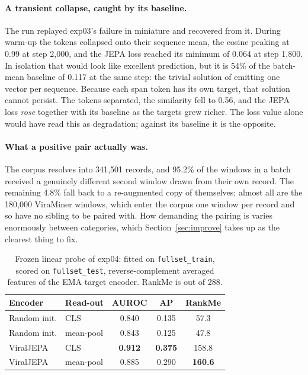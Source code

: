 \documentclass[10pt,twocolumn,a4paper]{article}
\begin{document}
\paragraph{A transient collapse, caught by its baseline.}
The run replayed exp03's failure in miniature and recovered from it. During
warm-up the tokens collapsed onto their sequence mean, the cosine peaking at 0.99
at step 2{,}000, and the JEPA loss reached its minimum of 0.064 at step 1{,}800.
In isolation that would look like excellent prediction, but it is 54\% of the
batch-mean baseline of 0.117 at the same step: the trivial solution of emitting
one vector per sequence. Because each span token has
its own target, that solution cannot persist. The tokens separated, the
similarity fell to 0.56, and the JEPA loss \emph{rose} together with its baseline
as the targets grew richer. The loss value alone would have read this as
degradation; against its baseline it is the opposite.

\paragraph{What a positive pair actually was.}
The corpus resolves into 341{,}501 records, and 95.2\% of the windows in a batch
received a genuinely different second window drawn from their own record. The
remaining 4.8\% fall back to a re-augmented copy of themselves; almost all are
the 180{,}000 ViraMiner windows, which enter the corpus one window per record and
so have no sibling to be paired with. How demanding the pairing is varies
enormously between categories, which Section~\ref{sec:improve} takes up as the
clearest thing to fix.

\begin{table}[t]
\centering
\caption{Frozen linear probe of exp04: fitted on \texttt{fullset\_train}, scored
on \texttt{fullset\_test}, reverse-complement averaged features of the EMA target
encoder. RankMe is out of 288.}
\label{tab:probe}
\footnotesize
\setlength{\tabcolsep}{4pt}
\begin{tabular}{llccc}
\toprule
Encoder & Read-out & AUROC & AP & RankMe \\
\midrule
Random init. & CLS       & 0.840 & 0.135 & 57.3 \\
Random init. & mean-pool & 0.843 & 0.125 & 47.8 \\
ViralJEPA    & CLS       & \textbf{0.912} & \textbf{0.375} & 158.8 \\
ViralJEPA    & mean-pool & 0.885 & 0.290 & \textbf{160.6} \\
\bottomrule
\end{tabular}
\end{table}
\end{document}

